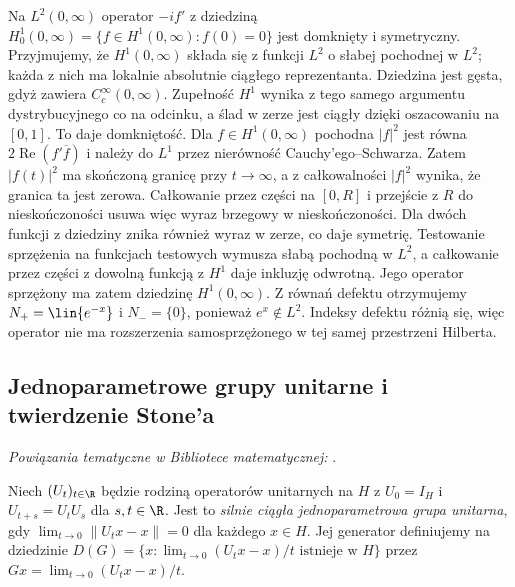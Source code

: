 \begin{przyklad}
Na $L^2(0,\infty)$ operator $-if'$ z dziedziną
$H_0^1(0,\infty)=\{f\in H^1(0,\infty):f(0)=0\}$
jest domknięty i symetryczny. Przyjmujemy, że $H^1(0,\infty)$
składa się z funkcji $L^2$ o słabej pochodnej w $L^2$;
każda z nich ma lokalnie absolutnie ciągłego reprezentanta.
Dziedzina jest gęsta, gdyż zawiera $C_c^\infty(0,\infty)$.
Zupełność $H^1$ wynika z tego samego argumentu dystrybucyjnego
co na odcinku, a ślad w zerze jest ciągły dzięki oszacowaniu
na $[0,1]$. To daje domkniętość. Dla $f\in H^1(0,\infty)$
pochodna $|f|^2$ jest równa $2\operatorname{Re}(f'\overline f)$
i należy do $L^1$ przez nierówność Cauchy'ego--Schwarza.
Zatem $|f(t)|^2$ ma skończoną granicę przy $t\to\infty$,
a z całkowalności $|f|^2$ wynika, że granica ta jest zerowa.
Całkowanie przez części na $[0,R]$ i przejście z $R$ do
nieskończoności usuwa więc wyraz brzegowy w nieskończoności.
Dla dwóch funkcji z dziedziny znika również wyraz w zerze,
co daje symetrię. Testowanie sprzężenia na funkcjach testowych
wymusza słabą pochodną w $L^2$, a całkowanie przez części
z dowolną funkcją z $H^1$ daje inkluzję odwrotną.
Jego operator sprzężony ma zatem dziedzinę $H^1(0,\infty)$. Z równań defektu otrzymujemy
$N_+=\lin\{e^{-x}\}$ i $N_- =\{0\}$, ponieważ $e^x\notin L^2$.
Indeksy defektu różnią się, więc operator nie ma rozszerzenia
samosprzężonego w tej samej przestrzeni Hilberta.
\end{przyklad}

\subsection{Jednoparametrowe grupy unitarne i twierdzenie Stone'a}

\noindent\emph{Powiązania tematyczne w Bibliotece matematycznej:} .


\begin{definicja}
Niech $(U_t)_{t\in\R}$ będzie rodziną operatorów unitarnych
na $H$ z $U_0=I_H$ i $U_{t+s}=U_tU_s$ dla $s,t\in\R$.
Jest to \emph{silnie ciągła jednoparametrowa grupa unitarna}, gdy
$\lim_{t\to0}\|U_tx-x\|=0$ dla każdego $x\in H$.
Jej generator definiujemy na dziedzinie
$D(G)=\{x:\lim_{t\to0}(U_tx-x)/t\text{ istnieje w }H\}$
przez $Gx=\lim_{t\to0}(U_tx-x)/t$.
\end{definicja}

